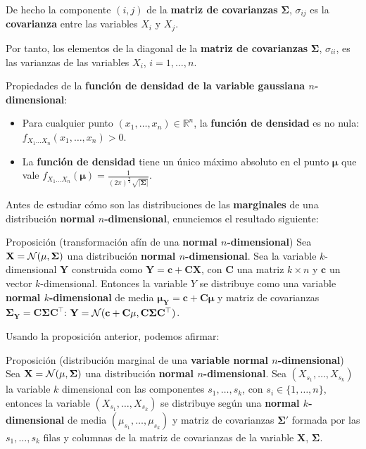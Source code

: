 \documentclass[]{book}
\begin{document}
De hecho la componente \((i,j)\) de la \textbf{matriz de covarianzas} \(\mathbf{\Sigma}\), \(\sigma_{ij}\) es la \textbf{covarianza} entre las variables \(X_i\) y \(X_j\).

Por tanto, los elementos de la diagonal de la \textbf{matriz de covarianzas} \(\mathbf{\Sigma}\), \(\sigma_{ii}\), es las varianzas de las variables \(X_i\), \(i=1,\ldots,n\).

Propiedades de la \textbf{función de densidad de la variable gaussiana \(n\)-dimensional}:

\begin{itemize}
\item
  Para cualquier punto \((x_1,\ldots,x_n)\in\mathbb{R}^n\), la \textbf{función de densidad} es no nula: \(f_{X_1\ldots X_n}(x_1,\ldots,x_n)>0\).
\item
  La \textbf{función de densidad} tiene un único máximo absoluto en el punto \(\mathbf{\mu}\) que vale \(f_{X_1\ldots X_n}(\mathbf{\mu})=\frac{1}{(2\pi)^{\frac{n}{2}}\sqrt{\mathbf{|\Sigma|}}}\).
\end{itemize}

Antes de estudiar cómo son las distribuciones de las \textbf{marginales} de una distribución \textbf{normal \(n\)-dimensional}, enunciemos el resultado siguiente:

Proposición (transformación afín de una \textbf{normal \(n\)-dimensional})
Sea \(\mathbf{X}={\cal N}(\mathbf{\mu},\mathbf{\Sigma})\) una distribución \textbf{normal \(n\)-dimensional}. Sea la variable \(k\)-dimensional \(\mathbf{Y}\) construida como \(\mathbf{Y}=\mathbf{c}+\mathbf{C}\mathbf{X}\), con \(\mathbf{C}\) una matriz \(k\times n\) y \(\mathbf{c}\) un vector \(k\)-dimensional. Entonces la variable \(Y\) se distribuye como una variable \textbf{normal \(k\)-dimensional} de media \(\mathbf{\mu}_{\mathbf{Y}}=\mathbf{c}+\mathbf{C}\mathbf{\mu}\) y matriz de covarianzas \(\mathbf{\Sigma}_{\mathbf{Y}}=\mathbf{C}\mathbf{\Sigma}\mathbf{C}^\top\): \(\mathbf{Y}={\cal N}(\mathbf{c}+\mathbf{C}\mathbf{\mu},\mathbf{C}\mathbf{\Sigma}\mathbf{C}^\top)\).

Usando la proposición anterior, podemos afirmar:

Proposición (distribución marginal de una \textbf{variable normal \(n\)-dimensional})
Sea \(\mathbf{X}={\cal N}(\mathbf{\mu},\mathbf{\Sigma})\) una distribución \textbf{normal \(n\)-dimensional}. Sea \((X_{s_1},\ldots,X_{s_k})\) la variable \(k\) dimensional con las componentes \(s_1,\ldots,s_k\), con \(s_i\in\{1,\ldots,n\}\), entonces la variable \((X_{s_1},\ldots,X_{s_k})\) se distribuye según una \textbf{normal \(k\)-dimensional} de media \((\mu_{s_1},\ldots,\mu_{s_k})\) y matriz de covarianzas \(\mathbf{\Sigma'}\) formada por las \(s_1,\ldots,s_k\) filas y columnas de la matriz de covarianzas de la variable \(\mathbf{X}\), \(\mathbf{\Sigma}\).
\end{document}
